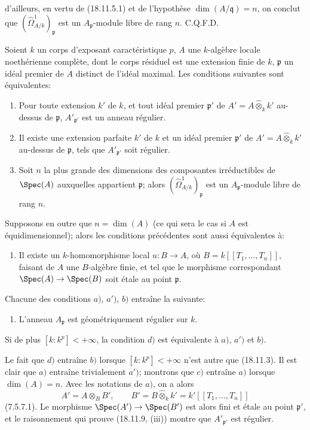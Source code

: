 
d'ailleurs, en vertu de (18.11.5.1) et de l'hypothèse $\dim(A/\mathfrak q)=n$, on conclut que $(\hat{\Omega}^1_{A/k})_{\mathfrak p}$ est un $A_{\mathfrak p}$-module libre de rang $n$. C.Q.F.D.

\begin{theorem}[18.11.10]
\label{IV.18.11.10}
Soient $k$ un corps d'exposant caractéristique $p$, $A$ une $k$-algèbre locale noethérienne complète, dont le corps résiduel est une extension finie de $k$, $\mathfrak p$ un idéal premier de $A$ distinct de l'idéal maximal. Les conditions suivantes sont équivalentes:
\begin{enumerate}
  \item[$a)$] Pour toute extension $k'$ de $k$, et tout idéal premier $\mathfrak p'$ de $A'=A\widehat{\otimes}_k k'$ au-dessus de $\mathfrak p$, $A'_{\mathfrak p'}$ est un anneau régulier.
  \item[$a')$] Il existe une extension parfaite $k'$ de $k$ et un idéal premier $\mathfrak p'$ de $A'=A\widehat{\otimes}_k k'$ au-dessus de $\mathfrak p$, tels que $A'_{\mathfrak p'}$ soit régulier.
  \item[$b)$] Soit $n$ la plus grande des dimensions des composantes irréductibles de $\Spec(A)$ auxquelles appartient $\mathfrak p$; alors $(\hat{\Omega}^1_{A/k})_{\mathfrak p}$ est un $A_{\mathfrak p}$-module libre de rang $n$.
\end{enumerate}
Supposons en outre que $n=\dim(A)$ (ce qui sera le cas si $A$ est équidimensionnel); alors les conditions précédentes sont aussi équivalentes à:
\begin{enumerate}
  \item[$c)$] Il existe un $k$-homomorphisme local $u:B\to A$, où $B=k[[T_1,\ldots,T_n]]$, faisant de $A$ une $B$-algèbre finie, et tel que le morphisme correspondant $\Spec(A)\to\Spec(B)$ soit étale au point $\mathfrak p$.
\end{enumerate}
Chacune des conditions $a)$, $a')$, $b)$ entraîne la suivante:
\begin{enumerate}
  \item[$d)$] L'anneau $A_{\mathfrak p}$ est géométriquement régulier sur $k$.
\end{enumerate}
Si de plus $[k:k^p]<+\infty$, la condition $d)$ est équivalente à $a)$, $a')$ et $b)$.
\end{theorem}

Le fait que $d)$ entraîne $b)$ lorsque $[k:k^p]<+\infty$ n'est autre que (18.11.3). Il est clair que $a)$ entraîne trivialement $a')$; montrons que $c)$ entraîne $a)$ lorsque $\dim(A)=n$. Avec les notations de $a)$, on a alors
\[
  A'=A\otimes_B B',\qquad B'=B\widehat{\otimes}_k k'=k'[[T_1,\ldots,T_n]]
\]
(7.5.7.1). Le morphisme $\Spec(A')\to\Spec(B')$ est alors fini et étale au point $\mathfrak p'$, et le raisonnement qui prouve (18.11.9, (iii)) montre que $A'_{\mathfrak p'}$ est régulier.

